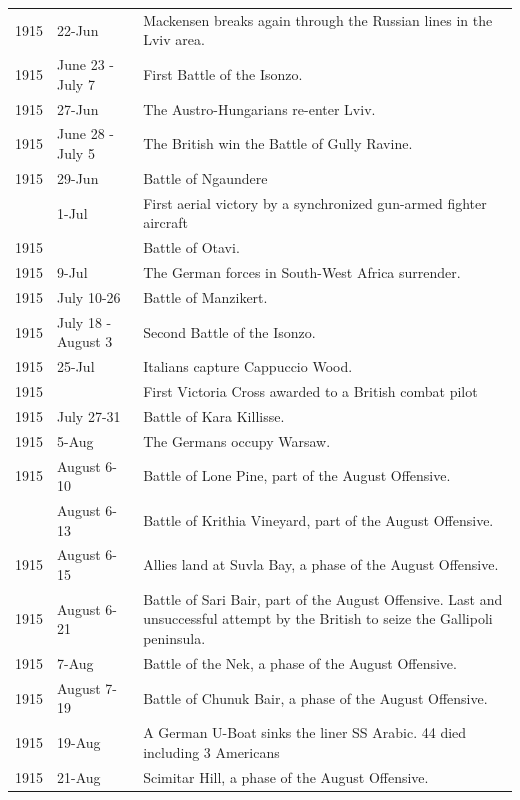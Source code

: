 \documentclass[
  openany]{book}
\begin{document}
\begin{longtable}[t]{rl>{\raggedright\arraybackslash}p{22em}}
\addlinespace
\rowcolor{gray!6}  1915 & 22-Jun & Mackensen breaks again through the Russian lines in the Lviv area.\\
1915 & June 23 - July 7 & First Battle of the Isonzo.\\
\rowcolor{gray!6}  1915 & 27-Jun & The Austro-Hungarians re-enter Lviv.\\
1915 & June 28 - July 5 & The British win the Battle of Gully Ravine.\\
\rowcolor{gray!6}  1915 & 29-Jun & Battle of Ngaundere\\
\addlinespace
1915 & 1-Jul & First aerial victory by a synchronized gun-armed fighter aircraft\\
\rowcolor{gray!6}  1915 &  & Battle of Otavi.\\
1915 & 9-Jul & The German forces in South-West Africa surrender.\\
\rowcolor{gray!6}  1915 & July 10-26 & Battle of Manzikert.\\
1915 & July 18 - August 3 & Second Battle of the Isonzo.\\
\addlinespace
\rowcolor{gray!6}  1915 & 25-Jul & Italians capture Cappuccio Wood.\\
1915 &  & First Victoria Cross awarded to a British combat pilot\\
\rowcolor{gray!6}  1915 & July 27-31 & Battle of Kara Killisse.\\
1915 & 5-Aug & The Germans occupy Warsaw.\\
\rowcolor{gray!6}  1915 & August 6-10 & Battle of Lone Pine, part of the August Offensive.\\
\addlinespace
1915 & August 6-13 & Battle of Krithia Vineyard, part of the August Offensive.\\
\rowcolor{gray!6}  1915 & August 6-15 & Allies land at Suvla Bay, a phase of the August Offensive.\\
1915 & August 6-21 & Battle of Sari Bair, part of the August Offensive. Last and unsuccessful attempt by the British to seize the Gallipoli peninsula.\\
\rowcolor{gray!6}  1915 & 7-Aug & Battle of the Nek, a phase of the August Offensive.\\
1915 & August 7-19 & Battle of Chunuk Bair, a phase of the August Offensive.\\
\addlinespace
\rowcolor{gray!6}  1915 & 19-Aug & A German U-Boat sinks the liner SS Arabic. 44 died including 3 Americans\\
1915 & 21-Aug & Scimitar Hill, a phase of the August Offensive.\\

\end{longtable}
\end{document}
